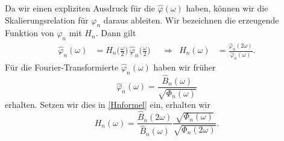 Da wir einen expliziten Ausdruck für die $\hat{\varphi}(\omega)$ haben,
können wir die Skalierungsrelation für $\varphi_n$ daraus ableiten.
Wir bezeichnen die erzeugende Funktion von $\varphi_n$ mit $H_n$.
Dann gilt
\begin{equation}
\begin{aligned}
\hat{\varphi}_n(\omega)
&=
H_n\biggl(\frac{\omega}2\biggr)
\,
\hat{\varphi}_n\biggl(\frac{\omega}2\biggr)
&&\Rightarrow&
H_n(\omega)
&=
\frac{\hat{\varphi}_n(2\omega)}{\hat{\varphi}_n(\omega)}.
\end{aligned}
\label{Hnformel}
\end{equation}
Für die Fourier-Transformierte $\hat{\varphi}_n(\omega)$ haben wir früher
\[
\hat{\varphi}_n(\omega)
=
\frac{\hat{B}_n(\omega)}{\sqrt{\Phi_n(\omega)}}
\]
erhalten.
Setzen wir dies in \eqref{Hnformel} ein, erhalten wir
\begin{equation}
H_n(\omega)
=
\frac{\hat{B}_n(2\omega)}{\hat{B}_n(\omega)}
\frac{\sqrt{\Phi_n(\omega)}}{\sqrt{\Phi_n(2\omega)}}.
\label{formel:phinskal}
\end{equation}

